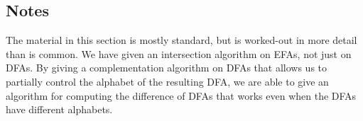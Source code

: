 \subsection{Notes}

The material in this section is mostly standard, but is worked-out in
more detail than is common.  We have given an intersection algorithm
on EFAs, not just on DFAs.  By giving a complementation algorithm on
DFAs that allows us to partially control the alphabet of the resulting
DFA, we are able to give an algorithm for computing the difference of
DFAs that works even when the DFAs have different alphabets.

%
%

